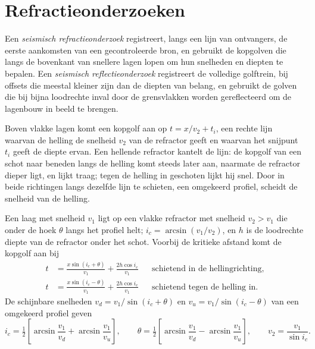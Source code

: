 \section{Refractieonderzoeken}

\begin{definition}\label{def:b3:exploration-seismology:surveys}
Een \emph{seismisch refractieonderzoek} registreert, langs
een lijn van ontvangers, de eerste aankomsten van een gecontroleerde bron, en gebruikt de
kopgolven die langs de bovenkant van snellere lagen lopen om hun snelheden en
diepten te bepalen. Een \emph{seismisch reflectieonderzoek}
registreert de volledige golftrein, bij offsets die meestal kleiner zijn dan de diepten van
belang, en gebruikt de golven die bij bijna loodrechte inval door de
grensvlakken worden gereflecteerd om de lagenbouw in beeld te brengen.
\end{definition}

Boven vlakke lagen komt een kopgolf aan op $t = x/v_2 + t_i$, een rechte lijn
waarvan de helling de snelheid $v_2$ van de refractor geeft en waarvan het snijpunt $t_i$
geeft de diepte ervan. Een hellende refractor kantelt de lijn: de kopgolf van een schot
naar beneden langs de helling komt steeds later aan, naarmate de refractor dieper ligt, en lijkt traag;
tegen de helling in geschoten lijkt hij snel. Door in beide richtingen langs dezelfde lijn te schieten, een omgekeerd
profiel, scheidt de snelheid van de helling.

\begin{theorem}\label{thm:b3:exploration-seismology:dipping}
Een laag met snelheid $v_1$ ligt op een vlakke refractor met snelheid $v_2 > v_1$ die
onder de hoek $\theta$ langs het profiel helt; $i_c = \arcsin(v_1/v_2)$, en $h$ is de
loodrechte diepte van de refractor onder het schot. Voorbij de kritieke
afstand komt de kopgolf aan bij
\begin{align*}
  t &= \frac{x\sin(i_c + \theta)}{v_1} + \frac{2h\cos i_c}{v_1}
  &&\text{schietend in de hellingrichting},\\
  t &= \frac{x\sin(i_c - \theta)}{v_1} + \frac{2h\cos i_c}{v_1}
  &&\text{schietend tegen de helling in}.
\end{align*}
De schijnbare snelheden $v_d = v_1/\sin(i_c + \theta)$ en
$v_u = v_1/\sin(i_c - \theta)$ van een omgekeerd profiel geven
\[
  i_c = \tfrac12\left[\arcsin\frac{v_1}{v_d} + \arcsin\frac{v_1}{v_u}\right],\qquad
  \theta = \tfrac12\left[\arcsin\frac{v_1}{v_d} - \arcsin\frac{v_1}{v_u}\right],
  \qquad v_2 = \frac{v_1}{\sin i_c} .
\]
\end{theorem}

